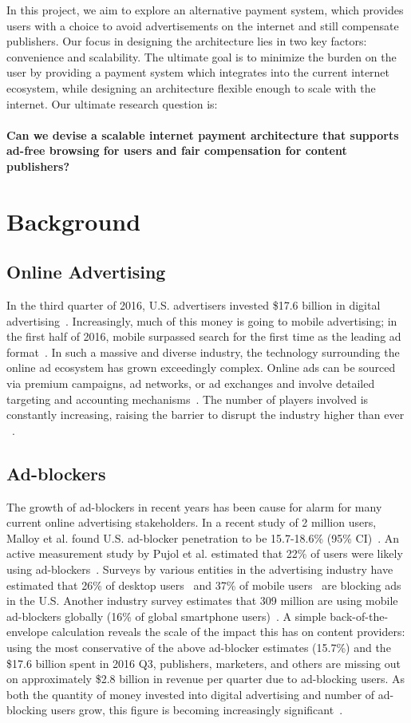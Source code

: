 \documentclass[letterpaper,twocolumn,10pt]{article}
\begin{document}
In this project, we aim to explore an alternative payment system,
which provides users with a choice to avoid advertisements on the
internet and still compensate publishers. Our focus in designing the
architecture lies in two key factors: convenience and scalability. The
ultimate goal is to minimize the burden on the user by providing a
payment system which integrates into the current internet ecosystem,
while designing an architecture flexible enough to scale with the
internet. Our ultimate research question is: \\
\\
\textbf{Can we devise a scalable internet payment architecture that
  supports ad-free browsing for users and fair compensation for
  content publishers?}

\section{Background}
\subsection{Online Advertising}
In the third quarter of 2016, U.S. advertisers invested \$17.6 billion
in digital advertising~\cite{iabq3}. Increasingly, much of this money
is going to mobile advertising; in the first half of 2016, mobile
surpassed search for the first time as the leading ad
format~\cite{iab2016}. In such a massive and diverse industry, the
technology surrounding the online ad ecosystem has grown exceedingly
complex. Online ads can be sourced via premium campaigns, ad networks,
or ad exchanges and involve detailed targeting and accounting
mechanisms~\cite{adscape}. The number of players involved is
constantly increasing, raising the barrier to disrupt the industry
higher than ever ~\cite{lumascape}.

\subsection{Ad-blockers}
The growth of ad-blockers in recent years has been cause for alarm for
many current online advertising stakeholders. In a recent study of 2
million users, Malloy et al. found U.S. ad-blocker penetration to be
15.7-18.6\% (95\% CI)~\cite{malloy}. An active measurement study by
Pujol et al. estimated that 22\% of users were likely using
ad-blockers~\cite{pujol}. Surveys by various entities in the
advertising industry have estimated that 26\% of desktop
users~\cite{iab-blockers} and 37\% of mobile users~\cite{gwi} are
blocking ads in the U.S. Another industry survey estimates that 309
million are using mobile ad-blockers globally (16\% of global
smartphone users)~\cite{pagefair}. A simple back-of-the-envelope
calculation reveals the scale of the impact this has on content
providers: using the most conservative of the above ad-blocker
estimates (15.7\%) and the \$17.6 billion spent in 2016 Q3,
publishers, marketers, and others are missing out on approximately
\$2.8 billion in revenue per quarter due to ad-blocking users. As both
the quantity of money invested into digital advertising and number of
ad-blocking users grow, this figure is becoming increasingly
significant~\cite{iab2016}.
\end{document}
